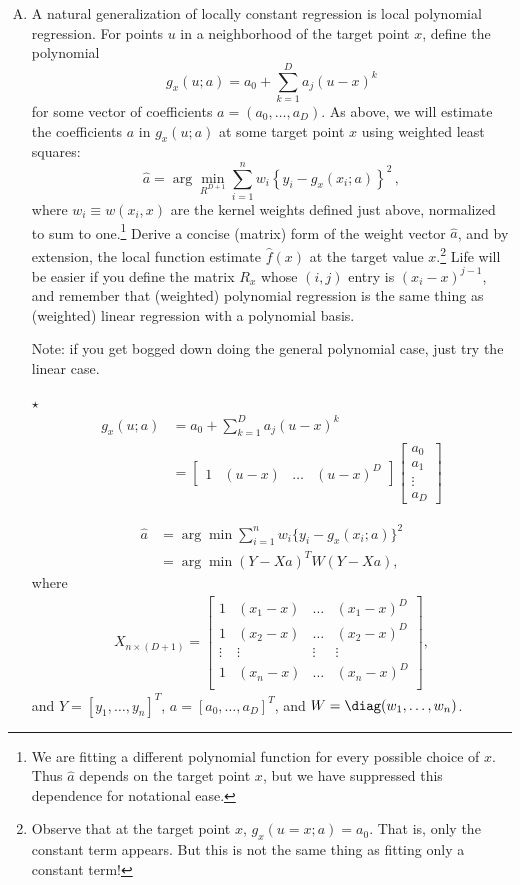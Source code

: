 \documentclass[11pt]{article}
\newcommand{\jie}{$\star$ }
\begin{document}
\begin{enumerate}[(A)]

\item  A natural generalization of locally constant regression is local polynomial regression.  For points $u$ in a neighborhood of the target point $x$, define the polynomial
$$
g_{x}(u; a) = a_0 + \sum_{k=1}^D a_j(u-x)^k 
$$
for some vector of coefficients $a = (a_0, \ldots, a_D)$.  As above, we will estimate the coefficients $a$ in $g_{x}(u; a)$ at some target point $x$ using weighted least squares:
$$
\hat{a} = \arg \min_{R^{D+1}} \sum_{i=1}^n w_i \left\{ y_i - g_{x}(x_i; a)  \right\}^2 \, ,
$$
where $w_i \equiv w(x_i, x)$ are the kernel weights defined just above, normalized to sum to one.\footnote{We are fitting a different polynomial function for every possible choice of $x$.  Thus $\hat{a}$ depends on the target point $x$, but we have suppressed this dependence for notational ease.} Derive a concise (matrix) form of the weight vector $\hat{a}$, and by extension, the local function estimate $\hat{f}(x)$ at the target value $x$.\footnote{Observe that at the target point $x$, $g_x(u = x; a) = a_0$.  That is, only the constant term appears.  But this is not the same thing as fitting only a constant term!}   Life will be easier if you define the matrix $R_x$ whose $(i,j)$ entry is $(x_i-x)^{j-1}$, and remember that (weighted) polynomial regression is the same thing as (weighted) linear regression with a polynomial basis.

Note: if you get bogged down doing the general polynomial case, just try the linear case.

\bigskip \jie
\begin{align*}
    g_x(u;a) &= a_0 + \sum_{k=1}^D a_j (u-x)^k \\
    &= \begin{bmatrix}
    1 & (u-x) & \dots & (u-x)^D
    \end{bmatrix}
    \begin{bmatrix}
    a_0 \\ a_1 \\ \vdots \\ a_D
    \end{bmatrix}
\end{align*}

\begin{align*}
    \hat{a} &= \arg \min \sum_{i=1}^n w_i \{y_i - g_x(x_i; a)\}^2 \\
    &= \arg \min (Y - Xa)^T W (Y - Xa),
\end{align*}
where
\begin{align*}
    X_{n \times (D+1)} = \begin{bmatrix}
    1 & (x_1 - x) & \dots & (x_1 - x)^D \\
    1 & (x_2 - x) & \dots & (x_2 - x)^D \\
    \vdots & \vdots & \vdots & \vdots \\
    1 & (x_n - x) & \dots & (x_n - x)^D \\
    \end{bmatrix},
\end{align*}
and $Y = [y_1, \dots, y_n]^T$, $a = [a_0, \dots, a_D]^T$, and $W = \diag (w_1, \dots, w_n)$.


\end{enumerate}
\end{document}
